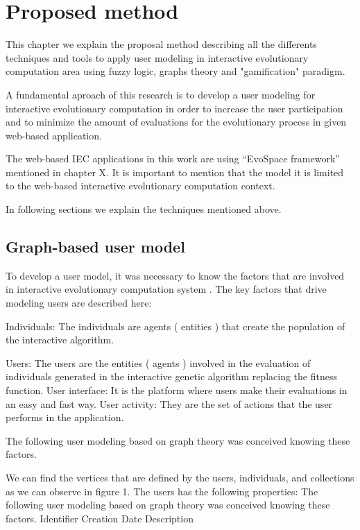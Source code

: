 \chapter{Proposed method}

This chapter we explain the proposal method describing all the differents
techniques and  tools to apply user modeling in interactive evolutionary
computation area using fuzzy logic, graphs theory and "gamification" paradigm.

A fundamental aproach of this research is to develop a user modeling for
interactive evolutionary computation in order to increase the user participation
and to minimize the amount of evaluations for the evolutionary process in given 
web-based application.

The web-based IEC applications in this work are using
“EvoSpace framework” mentioned in chapter X. It is important to mention that the
model it is limited to the web-based interactive evolutionary computation context.

In following sections we explain the techniques mentioned above.


\section{Graph-based user model} 

To develop a user model, it was necessary to know the factors that are involved in
interactive evolutionary computation system . The key factors
that drive modeling users are described here:

Individuals: The individuals are agents ( entities ) that create the population
of the interactive algorithm.

Users: The users are the entities ( agents )
involved in the evaluation of individuals generated in the interactive genetic
algorithm replacing the fitness function. 
User interface: It is the platform where users make their evaluations in an 
easy and fast way. 
User activity: They are the set of actions that the user performs in the application.

The following user modeling based on graph theory was conceived knowing these factors.

We can find the vertices that are defined by the users, individuals, and
collections as we can observe in figure 1. The users has the following
properties: The following user modeling based on graph theory was conceived
knowing these factors.  Identifier Creation Date Description

